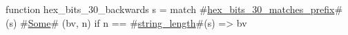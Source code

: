 function hex_bits_30_backwards s =
  match #\hyperref[sailRISCVzhexzybitszy30zymatcheszyprefix]{hex\_bits\_30\_matches\_prefix}#(s) {
      #\hyperref[sailRISCVzSome]{Some}# (bv, n) if n == #\hyperref[sailRISCVzstringzylength]{string\_length}#(s) => bv
  }
